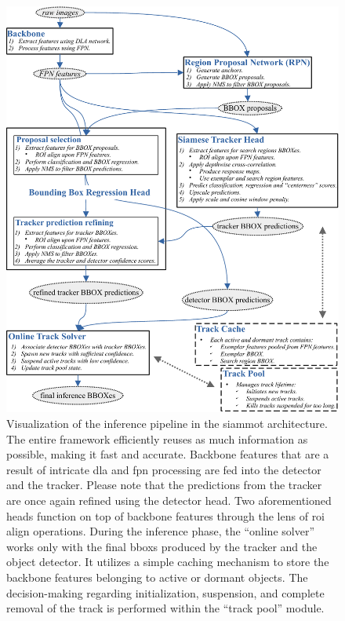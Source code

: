 \begin{figure}[!t]
    \centering
    \includegraphics[width=\linewidth]{figures/siamese_tracking/siammot_inference_diagram.pdf}
    \caption[\gls{siammot} inference diagram]{Visualization of the inference pipeline in the \gls{siammot} architecture. The entire framework efficiently reuses as much information as possible, making it fast and accurate. Backbone features that are a result of intricate \gls{dla} and \gls{fpn} processing are fed into the detector and the tracker. Please note that the predictions from the tracker are once again refined using the detector head. Two aforementioned heads function on top of backbone features through the lens of \gls{roi} align operations. During the inference phase, the ``online solver'' works only with the final \glspl{bbox} produced by the tracker and the object detector. It utilizes a simple caching mechanism to store the backbone features belonging to active or dormant objects. The decision-making regarding initialization, suspension, and complete removal of the track is performed within the ``track pool'' module.}
    \label{fig:SiamMOTInference}
\end{figure}

